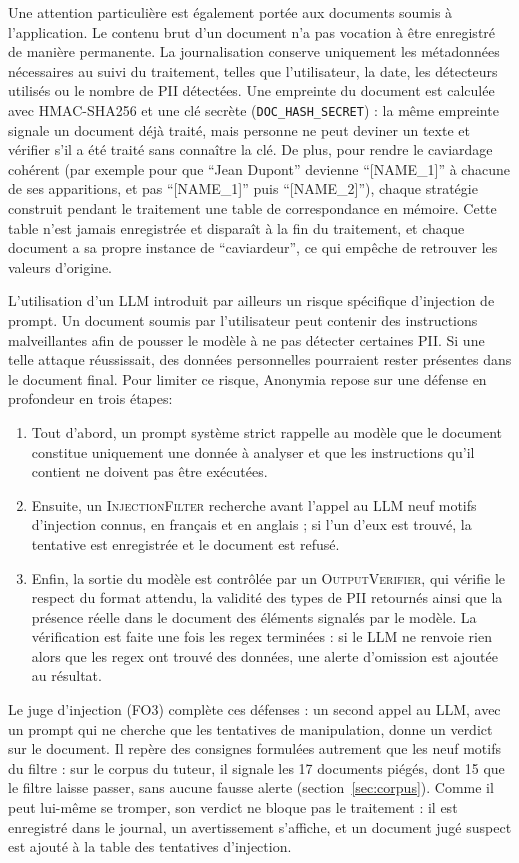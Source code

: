 \documentclass[12pt,a4paper]{article}
\begin{document}
Une attention particulière est également portée aux documents soumis à l'application. Le contenu brut d'un document n'a pas vocation à être enregistré de manière permanente. La journalisation conserve uniquement les métadonnées nécessaires au suivi du traitement, telles que l'utilisateur, la date, les détecteurs utilisés ou le nombre de PII détectées. Une empreinte du document est calculée avec HMAC-SHA256 et une clé secrète (\texttt{DOC\_HASH\_SECRET}) : la même empreinte signale un document déjà traité, mais personne ne peut deviner un texte et vérifier s'il a été traité sans connaître la clé. De plus, pour rendre le caviardage cohérent (par exemple pour que “Jean Dupont” devienne “[NAME\_1]” à chacune de ses apparitions, et pas “[NAME\_1]” puis “[NAME\_2]”), chaque stratégie construit pendant le traitement une table de correspondance en mémoire. Cette table n'est jamais enregistrée et disparaît à la fin du traitement, et chaque document a sa propre instance de “caviardeur”, ce qui empêche de retrouver les valeurs d'origine. 

L'utilisation d'un LLM introduit par ailleurs un risque spécifique d'injection de prompt. Un document soumis par l'utilisateur peut contenir des instructions malveillantes afin de pousser le modèle à ne pas détecter certaines PII. Si une telle attaque réussissait, des données personnelles pourraient rester présentes dans le document final. Pour limiter ce risque, Anonymia repose sur une défense en profondeur en trois étapes: 

\begin{enumerate}
\item Tout d'abord, un prompt système strict rappelle au modèle que le document constitue uniquement une donnée à analyser et que les instructions qu'il contient ne doivent pas être exécutées.
\item Ensuite, un \textsc{InjectionFilter} recherche avant l'appel au LLM neuf motifs d'injection connus, en français et en anglais ; si l'un d'eux est trouvé, la tentative est enregistrée et le document est refusé.
\item Enfin, la sortie du modèle est contrôlée par un \textsc{OutputVerifier}, qui vérifie le respect du format attendu, la validité des types de PII retournés ainsi que la présence réelle dans le document des éléments signalés par le modèle. La vérification est faite une fois les regex terminées : si le LLM ne renvoie rien alors que les regex ont trouvé des données, une alerte d'omission est ajoutée au résultat.
\end{enumerate}
Le juge d'injection (FO3) complète ces défenses : un second appel au LLM, avec un prompt qui ne cherche que les tentatives de manipulation, donne un verdict sur le document. Il repère des consignes formulées autrement que les neuf motifs du filtre : sur le corpus du tuteur, il signale les 17 documents piégés, dont 15 que le filtre laisse passer, sans aucune fausse alerte (section~\ref{sec:corpus}). Comme il peut lui-même se tromper, son verdict ne bloque pas le traitement : il est enregistré dans le journal, un avertissement s'affiche, et un document jugé suspect est ajouté à la table des tentatives d'injection.
\end{document}
